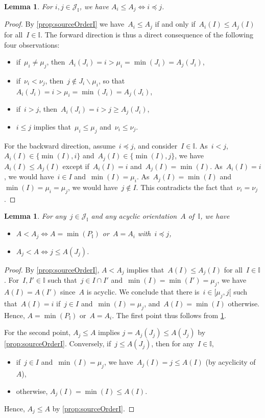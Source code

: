 \documentclass[reqno]{amsart}
\newtheorem{lemma}[theorem]{Lemma}
\theoremstyle{definition}
\newcommand{\cal}[1]{\mathcal{#1}} %
\newcommand{\ssm}{\smallsetminus} %
\newcommand{\II}{\mathbb I} %
\newcommand{\cJ}{\cal{J}} %
\begin{document}
\begin{lemma}
\label{lem:irrorder}
For $i,j \in \cJ_\II$, we have $A_i \le A_j \iff i \preccurlyeq j$.
\end{lemma}

\begin{proof}
By \cref{prop:sourceOrderI} we have~$A_i \le A_j$ if and only if~$A_i(I) \le A_j(I)$ for all~$I \in \II$.
%
The forward direction is thus a direct consequence of the following four observations:
\begin{itemize}
\item if~$\mu_i \ne \mu_j$, then~$A_i(J_i) = i > \mu_i = \min(J_i) = A_j(J_i)$,
\item if~$\nu_i < \nu_j$, then~$j \notin J_i \ssm \mu_i$, so that~$A_i(J_i) = i > \mu_i = \min(J_i) = A_j(J_i)$,
\item if~$i > j$, then~$A_i(J_i) = i > j \ge A_j(J_i)$,
\item $i \le j$ implies that~$\mu_i \le \mu_j$ and~$\nu_i \le \nu_j$.
\end{itemize}
%
For the backward direction, assume~$i \preccurlyeq j $, and consider~$I \in \II$.
As~$i < j$, $A_i(I) \in \{\min(I), i\}$ and~$A_j(I) \in \{\min(I), j\}$, we have~$A_i(I) \le A_j(I)$ except if~$A_i(I) = i$ and~$A_j(I) = \min(I)$.
As~$A_i(I) = i$, we would have~$i \in I$ and~$\min(I) = \mu_i$. As~$A_j(I) = \min(I)$ and~$\min(I) = \mu_i = \mu_j$, we would have~$j \notin I$.
This contradicts the fact that~$\nu_i = \nu_j$.
\end{proof}

\begin{lemma}
\label{lem:subirr}
For any~$j \in \cJ_\II$ and any acyclic orientation~$A$ of~$\II$, we have
\begin{itemize}
\item $A < A_j \iff A = \min(P_\II)$ or~$A = A_i$ with~$i \preccurlyeq j$,
\item $A_j < A \iff j \le A(J_j)$.
\end{itemize}
\end{lemma}

\begin{proof}
By \cref{prop:sourceOrderI}, $A < A_j$ implies that~$A(I) \le A_j(I)$ for all~$I \in \II$.
For~$I, I' \in \II$ such that~$j \in I \cap I'$ and~$\min(I) = \min(I') = \mu_j$, we have~$A(I) = A(I')$ since~$A$ is acyclic.
We conclude that there is~$i \in {[\mu_j, j[}$ such that~$A(I) = i$ if~$j \in I$ and~$\min(I) = \mu_j$, and~$A(I) = \min(I)$ otherwise.
Hence, $A = \min(P_\II)$ or~$A = A_i$.
The first point thus follows from \cref{lem:irrorder}.

For the second point, $A_j \le A$ implies $j = A_j(J_j) \le A(J_j)$ by \cref{prop:sourceOrderI}.
Conversely, if~$j \le A(J_j)$, then for any~$I \in \II$,
\begin{itemize}
\item if~$j \in I$ and~$\min(I) = \mu_j$, we have~$A_j(I) = j \le A(I)$ (by acyclicity of~$A$),
\item otherwise, $A_j(I) = \min(I) \le A(I)$.
\end{itemize}
Hence, $A_j \le A$ by \cref{prop:sourceOrderI}.
\end{proof}
\end{document}
